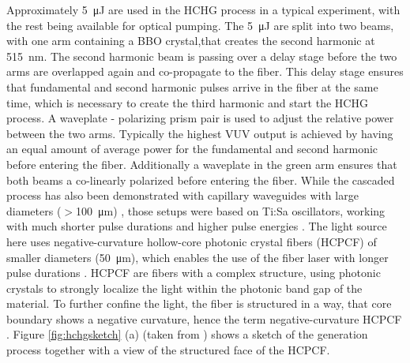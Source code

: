 Approximately \qty{5}{\micro\joule} are used in the HCHG process in a typical experiment, with the rest being available for optical pumping.
The \qty{5}{\micro\joule} are split into two beams, with one arm containing a BBO crystal,that creates the second harmonic at \qty{515}{\nano\meter}.
The second harmonic beam is passing over a delay stage before the two arms are overlapped again and co-propagate to the fiber.
This delay stage ensures that fundamental and second harmonic pulses arrive in the fiber at the same time, which is necessary to create the third harmonic and start the HCHG process.
A waveplate - polarizing prism pair is used to adjust the relative power between the two arms.
Typically the highest VUV output is achieved by having an equal amount of average power for the fundamental and second harmonic before entering the fiber.
Additionally a waveplate in the green arm ensures that both beams a co-linearly polarized before entering the fiber.
While the cascaded process has also been demonstrated with capillary waveguides with large diameters ($>$\qty{100}{\micro\meter}) \cite{misoguti_generation_2001}, those setups were based on Ti:Sa oscillators, working with much shorter pulse durations and higher pulse energies \cite{misoguti_generation_2001,durfee_phase_2002,misoguti_nonlinear_2005}.
The light source here uses negative-curvature hollow-core photonic crystal fibers (HCPCF) of smaller diameters (\qty{50}{\micro\meter}), which enables the use of the fiber laser with longer pulse durations \cite{couch_ultrafast_2020}.
HCPCF are fibers with a complex structure, using photonic crystals to strongly localize the light within the photonic band gap of the material. \cite{kolyadin_negative_2015, wei_negative_2017}
To further confine the light, the fiber is structured in a way, that core boundary shows a negative curvature, hence the term negative-curvature HCPCF \cite{wei_negative_2017}.
Figure \ref{fig:hchgsketch} (a) (taken from \cite{couch_ultrafast_2020}) shows a sketch of the generation process together with a view of the structured face of the HCPCF.

